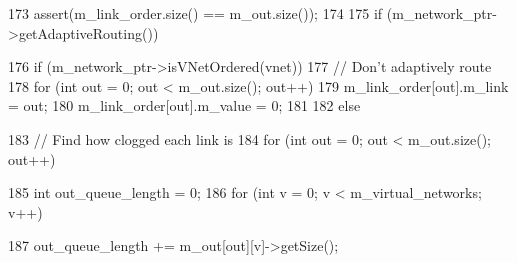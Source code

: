 \begin{DoxyCode}
{{{{{173                     assert(m_link_order.size() == m_out.size());
174 
175                     if (m_network_ptr->getAdaptiveRouting()) {
176                         if (m_network_ptr->isVNetOrdered(vnet)) {
177                             // Don't adaptively route
178                             for (int out = 0; out < m_out.size(); out++) {
179                                 m_link_order[out].m_link = out;
180                                 m_link_order[out].m_value = 0;
181                             }
182                         } else {
183                             // Find how clogged each link is
184                             for (int out = 0; out < m_out.size(); out++) {
185                                 int out_queue_length = 0;
186                                 for (int v = 0; v < m_virtual_networks; v++) {
187                                     out_queue_length += m_out[out][v]->getSize();
      
}}}}}}}}}
\end{DoxyCode}
